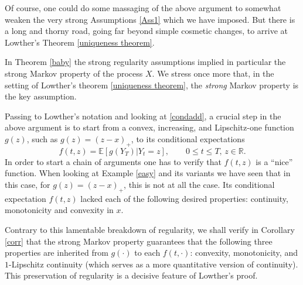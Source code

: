 \documentclass[11pt,a4paper]{article}%
\def\E{{\mathbb E}}
\def\R{{\mathbb R}}
\numberwithin{equation}{section}
\begin{document}
Of course, one could do some massaging of the above argument to somewhat weaken the very strong Assumptions \ref{Ass1} which we have imposed. But there is a long and thorny road, going far beyond simple cosmetic changes, to arrive at Lowther's  Theorem \ref{uniqueness theorem}.

In Theorem \ref{baby} the strong regularity assumptions implied in particular the strong Markov property of the process $X$. We stress once more that, in the setting of Lowther's theorem \ref{uniqueness theorem}, the \textit{strong} Markov property is the key assumption.
\vspace{1em}

Passing to Lowther's notation and looking at \eqref{condadd}, a crucial step in the above argument is to start from a convex, increasing, and Lipschitz-one function $g(z)$, such as $g(z)=(z-x)_+$, to its conditional expectations 
\begin{equation} \label{conda}
f(t,z) = \E [g(Y_T)|Y_t=z],   \qquad 0 \le t\le T,\, z \in \R.
\end{equation}
In order to start a chain of arguments one has to verify that $f(t,z)$ is a ``nice'' function.
When looking at Example \ref{easy} and its variants we have seen that in this case, for $g(z)=(z-x)_+$, this is not at all the case. 
Its conditional expectation $f(t,z)$ lacked each of the following desired properties: continuity, monotonicity and convexity in $x$. 

Contrary to this lamentable breakdown of regularity, we shall verify in Corollary \ref{corr} that the strong Markov property guarantees that the following three properties  are inherited from $g(\cdot)$ to each $f(t,\cdot)$: convexity, monotonicity, and $1$-Lipschitz continuity (which serves as a more quantitative version of continuity). This preservation of regularity is a decisive feature of Lowther's proof.


%
%
%
%
%
%
\end{document}
